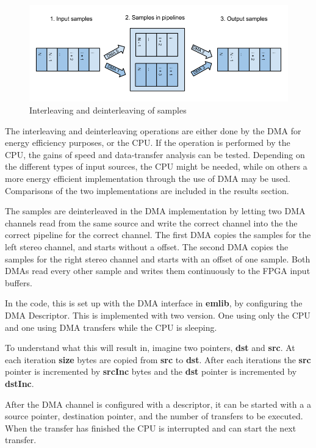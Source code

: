 \begin{figure}[H]
    \centering
    \includegraphics[width=1\textwidth]{figures/sw/interleaving-of-samples.png}
    \caption{Interleaving and deinterleaving of samples}
    \label{fig:interleaving}
\end{figure}

The interleaving and deinterleaving operations are either done by the DMA for
energy efficiency purposes, or the CPU. If the operation is performed by the
CPU, the gains of speed and data-transfer analysis can be tested. Depending on
the different types of input sources, the CPU might be needed, while on others a
more energy efficient implementation through the use of DMA may be used.
Comparisons of the two implementations are included in the results section.

The samples are deinterleaved in the DMA implementation by letting two DMA
channels read from the same source and write the correct channel into the the
correct pipeline for the correct channel. The first DMA copies the samples for
the left stereo channel, and starts without a offset. The second DMA copies the
samples for the right stereo channel and starts with an offset of one sample.
Both DMAs read every other sample and writes them continuously to the FPGA input
buffers.

In the code, this is set up with the DMA interface in {\bf emlib}, by
configuring the DMA Descriptor. This is implemented with two
version. One using only the CPU and one using DMA transfers while the CPU is
sleeping.

To understand what this will result in, imagine two pointers, {\bf dst} and {\bf
src}. At each iteration {\bf size} bytes are copied from {\bf src} to {\bf dst}.
After each iterations the {\bf src} pointer is incremented by {\bf srcInc} bytes
and the {\bf dst} pointer is incremented by {\bf dstInc}.

After the DMA channel is configured with a descriptor, it can be started with a
a source pointer, destination pointer, and the number of transfers to be
executed. When the transfer has finished the CPU is interrupted and can start
the next transfer.

